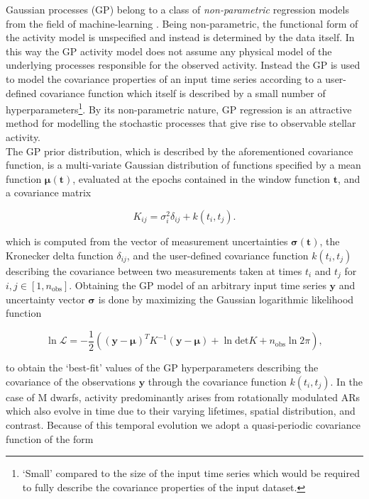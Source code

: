 Gaussian processes (GP) belong to a class of \emph{non-parametric} regression models from the field of machine-learning
\citep{rasmussen05}.
Being non-parametric, the functional form of the activity model is unspecified and instead is determined by the
data itself. In this way the GP activity model does not assume 
any physical model of the underlying processes responsible for the observed activity. Instead the GP is
used to model the covariance properties 
of an input time series according to a user-defined covariance function which itself is described by a small number
of hyperparameters\footnote{`Small' compared to the size of the input time series which would be required to fully
  describe the covariance properties of the input dataset.}.
By its non-parametric nature, GP regression is an attractive method for modelling the stochastic processes that give
rise to observable stellar activity. \\

The GP prior distribution, which is described by the aforementioned covariance function,
is a multi-variate Gaussian distribution of functions specified by a mean function
$\boldsymbol{\mu}(\mathbf{t})$, evaluated at the epochs contained in the window function $\mathbf{t}$,
and a covariance matrix

\begin{equation}
  K_{ij} = \sigma_i^2 \delta_{ij} + k(t_i,t_j). \label{BSeq:K}
\end{equation}

\noindent which
is computed from the vector of measurement uncertainties $\boldsymbol{\sigma}(\mathbf{t})$,
the Kronecker delta function $\delta_{ij}$, and
the user-defined covariance function $k(t_i,t_j)$ describing the covariance between two measurements taken at
times $t_i$ and $t_j$ for $i,j \in [1,n_{\text{obs}}]$.
Obtaining the GP model of an arbitrary input time series $\mathbf{y}$ and uncertainty vector
$\boldsymbol{\sigma}$ is done by maximizing the Gaussian logarithmic likelihood function

\begin{equation}
  \ln{\mathcal{L}} = -\frac{1}{2} \left( (\mathbf{y}-\boldsymbol{\mu})^T K^{-1}
  (\mathbf{y}-\boldsymbol{\mu}) + \ln{\mathrm{det} K} + n_{\text{obs}} \ln{2 \pi} \right), \label{BSeq:like}
\end{equation}
  
\noindent to obtain the `best-fit' values of the GP hyperparameters describing the covariance of the observations
$\mathbf{y}$ through the covariance function $k(t_i,t_j)$.
In the case of M dwarfs, activity predominantly arises from rotationally modulated ARs which also
evolve in time due to their varying lifetimes, spatial distribution, and contrast.
Because of this temporal evolution we adopt a quasi-periodic covariance function
of the form

